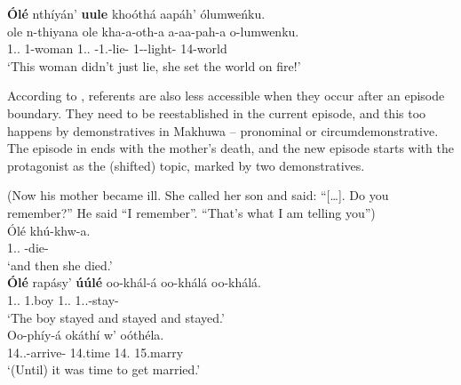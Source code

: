 \documentclass[output=paper]{langscibook}
\begin{document}
\textbf{Ólé}  nthíyán’  \textbf{uule}  khoóthá  aapáh’  ólumweńku.\\
\gll
ole  n-thiyana  ole  kha-a-oth-a  a-aa-pah-a  o-lumwenku.\\
1.\DEM{}.\DIST{}  1-woman  1.\DEM{}.\DIST{}  \NEG{}-1\SM{}.\IPFV{}-lie-\FV{}  1\SM{}-\IPFV{}-light-\FV{}  14-world\\
\glt
‘This woman didn’t just lie, she set the world on fire!’ \citep[180]{vanderWal2009a}\\

\z

According to \citet{Ariel2001}, referents are also less accessible when they occur after an episode boundary. They need to be reestablished in the current episode, and this too happens by demonstratives in Makhuwa – pronominal or circumdemonstrative. The episode in  ends with the mother’s death, and the new episode starts with the protagonist as the (shifted) topic, marked by two demonstratives. 

\ea
\label{bkm:Ref96953650}
(Now his mother became ill. She called her son and said: “[…]. Do you remember?” He said “I remember”. “That’s what I am telling you”)\\
\ea
\gll
Ólé  khú-khw-a.\\
1.\DEM{}.\DIST{}  \NARR{}-die-\FV{}\\
\glt
‘and then she died.’\\


\ex
\gll
\textbf{Ólé}  rapásy’  \textbf{úúlé}  oo-khál-á  oo-khálá  oo-khálá.\\
1.\DEM{}.\DIST{}  1.boy  1.\DEM{}.\DIST{}  1\SM{}.\PFV{}.\DJ{}-stay-\FV{}  \RED{}  \RED{}\\
\glt
    ‘The boy stayed and stayed and stayed.’\\


\ex
\gll
Oo-phíy-á  okáthí  w’  oóthéla.\\
14\SM{}.\PFV{}.\DJ{}-arrive-\FV{}  14.time  14.\CONN{}  15.marry\\
\glt
    ‘(Until) it was time to get married.’  \citep[203--204]{vanderWal2010}\\

\z
\z
\end{document}
